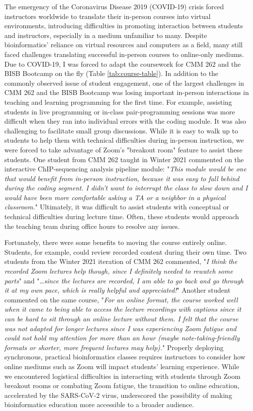 The emergency of the Coronavirus Disease 2019 (COVID-19) crisis forced instructors worldwide to translate their in-person courses into virtual environments, introducing difficulties in promoting interaction between students and instructors, especially in a medium unfamiliar to many. Despite bioinformatics' reliance on virtual resources and computers as a field, many still faced challenges translating successful in-person courses to online-only mediums. Due to COVID-19, I was forced to adapt the coursework for CMM 262 and the BISB Bootcamp on the fly (Table \ref{tab:course-table}). In addition to the commonly observed issue of student engagement, one of the largest challenges in CMM 262 and the BISB Bootcamp was losing important in-person interactions in teaching and learning programming for the first time. For example, assisting students in live programming or in-class pair-programming sessions was more difficult when they ran into individual errors with the coding module. It was also challenging to facilitate small group discussions. While it is easy to walk up to students to help them with technical difficulties during in-person instruction, we were forced to take advantage of Zoom's "breakout room" feature to assist these students. One student from CMM 262 taught in Winter 2021 commented on the interactive ChIP-sequencing analysis pipeline module: "\textit{This module would be one that would benefit from in-person instruction, because it was easy to fall behind during the coding segment. I didn't want to interrupt the class to slow down and I would have been more comfortable asking a TA or a neighbor in a physical classroom.}" Ultimately, it was difficult to assist students with conceptual or technical difficulties during lecture time. Often, these students would approach the teaching team during office hours to resolve any issues. 

Fortunately, there were some benefits to moving the course entirely online. Students, for example, could review recorded content during their own time. Two students from the Winter 2021 iteration of CMM 262 commented, "\textit{I think the recorded Zoom lectures help though, since I definitely needed to rewatch some parts}" and "\textit{…since the lectures are recorded, I am able to go back and go through it at my own pace, which is really helpful and appreciated!}" Another student commented on the same course, "\textit{For an online format, the course worked well when it came to being able to access the lecture recordings with captions since it can be hard to sit through an online lecture without them. I felt that the course was not adapted for longer lectures since I was experiencing Zoom fatigue and could not hold my attention for more than an hour (maybe note-taking-friendly formats or shorter, more frequent lectures may help).}" Properly deploying synchronous, practical bioinformatics classes requires instructors to consider how online mediums such as Zoom will impact students' learning experience. While we encountered logistical difficulties in interacting with students through Zoom breakout rooms or combating Zoom fatigue, the transition to online education, accelerated by the SARS-CoV-2 virus, underscored the possibility of making bioinformatics education more accessible to a broader audience. 

